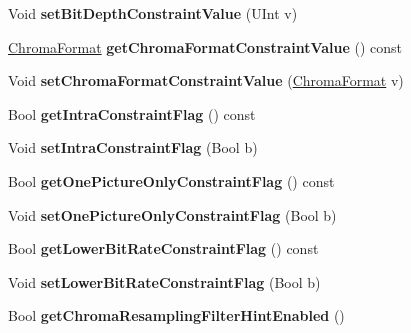 \begin{DoxyCompactItemize}
\mbox{\label{class_t_enc_cfg_a72ff13e9d57da9947948a13afc4ad2da}} 
Void {\bfseries set\+Bit\+Depth\+Constraint\+Value} (U\+Int v)
\item 
\mbox{\label{class_t_enc_cfg_ab76afc498c528b7c2e9ef57239072431}} 
\hyperlink{_type_def_8h_a4a6c51c10f2eb04abc7209db7caff39f}{Chroma\+Format} {\bfseries get\+Chroma\+Format\+Constraint\+Value} () const
\item 
\mbox{\label{class_t_enc_cfg_a03522049db27cdc77afa83a65246ca1c}} 
Void {\bfseries set\+Chroma\+Format\+Constraint\+Value} (\hyperlink{_type_def_8h_a4a6c51c10f2eb04abc7209db7caff39f}{Chroma\+Format} v)
\item 
\mbox{\label{class_t_enc_cfg_a123f0995c4b4ec7132325acccfeb8642}} 
Bool {\bfseries get\+Intra\+Constraint\+Flag} () const
\item 
\mbox{\label{class_t_enc_cfg_aec71770c96724c4f5144c887d55310dc}} 
Void {\bfseries set\+Intra\+Constraint\+Flag} (Bool b)
\item 
\mbox{\label{class_t_enc_cfg_ac46c4e5bbd7e66054324187c48c9e4d1}} 
Bool {\bfseries get\+One\+Picture\+Only\+Constraint\+Flag} () const
\item 
\mbox{\label{class_t_enc_cfg_a7aea7e22c420fe257b7182709c3e732f}} 
Void {\bfseries set\+One\+Picture\+Only\+Constraint\+Flag} (Bool b)
\item 
\mbox{\label{class_t_enc_cfg_a0db801de828eabe11722402877c4f0aa}} 
Bool {\bfseries get\+Lower\+Bit\+Rate\+Constraint\+Flag} () const
\item 
\mbox{\label{class_t_enc_cfg_a9d760f3390bbfbdb3a860b75afca5545}} 
Void {\bfseries set\+Lower\+Bit\+Rate\+Constraint\+Flag} (Bool b)
\item 
\mbox{\label{class_t_enc_cfg_a066608ade6d2c996963d60d01f7fe1e0}} 
Bool {\bfseries get\+Chroma\+Resampling\+Filter\+Hint\+Enabled} ()
\item 
\mbox{\label{class_t_enc_cfg_afaba3b45f0900759d8776bde55220358}} 

\end{DoxyCompactItemize}
